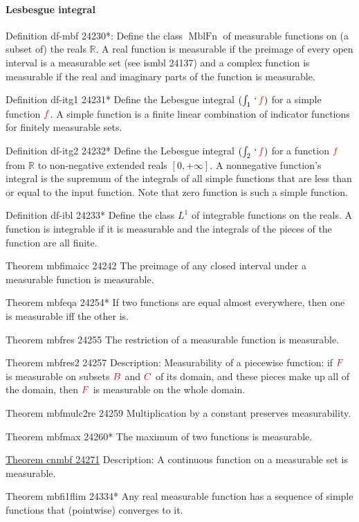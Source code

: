 \documentclass[12pt, letterpaper]{article}
\newcommand{\re}{\mathbb{R}}
\newcommand{\MblFn}{\operatorname{MblFn}}
\newcommand{\itgo}{\int_1}
\newcommand{\itgt}{\int_2}
\newcommand{\ibl}{L^1}
\newcommand{\red}[1]{{\color{red} #1}}
\newcommand{\purple}[1]{{\color{purple} #1}}
\newcommand{\setvar}{\red}
\newcommand{\classvar}{\purple}
\newcommand{\sff}{\setvar{f}}
\newcommand{\clB}{\classvar{B}}
\newcommand{\clC}{\classvar{C}}
\newcommand{\clF}{\classvar{F}}
\newcommand{\pnf}{\texttt{+}\infty}
\newcommand{\at}{\,`\,}
\theoremstyle{definition}
\theoremstyle{remark}
\theoremstyle{definition}
\theoremstyle{plain}
\begin{document}
	\paragraph{Lesbesgue integral}
	
	Definition	df-mbf 24230*:
	Define the class $\MblFn$ of measurable functions on (a subset of) the reals $\re$. A real function is measurable if the preimage of every open interval is a measurable set (see ismbl 24137) and a complex function is measurable if the real and imaginary parts of the function is measurable.
	
	Definition	df-itg1 24231*	Define the Lebesgue integral $(\itgo\at\sff)$ for a simple function $\sff$. A simple function is a finite linear combination of indicator functions for finitely measurable sets.
	
	Definition	df-itg2 24232*	Define the Lebesgue integral $(\itgt\at\sff)$ for a function $\sff$ from $\re$ to non-negative extended reals $[0,\pnf]$. A nonnegative function's integral is the supremum of the integrals of all simple functions that are less than or equal to the input function. Note that zero function is such a simple function.
	
	Definition	df-ibl 24233*	Define the class $\ibl$ of integrable functions on the reals. A function is integrable if it is measurable and the integrals of the pieces of the function are all finite.
	
	Theorem	mbfimaicc 24242	The preimage of any closed interval under a measurable function is measurable.
	
	Theorem	mbfeqa 24254*	If two functions are equal almost everywhere, then one is measurable iff the other is.
	
	Theorem	mbfres 24255	The restriction of a measurable function is measurable.
	
	Theorem mbfres2 24257
	Description: Measurability of a piecewise function: if $\clF$ is measurable on subsets $\clB$ and $\clC$ of its domain, and these pieces make up all of the domain, then $\clF$ is measurable on the whole domain. 
	
	Theorem	mbfmulc2re 24259	Multiplication by a constant preserves measurability.
	
	Theorem	mbfmax 24260*	The maximum of two functions is measurable.
	
	\href{https://us.metamath.org/mpeuni/cnmbf.html}{Theorem cnmbf 24271}
	Description: A continuous function on a measurable set is measurable.
	
	Theorem	mbfi1flim 24334*	Any real measurable function has a sequence of simple functions that (pointwise) converges to it.
	
\end{document}
